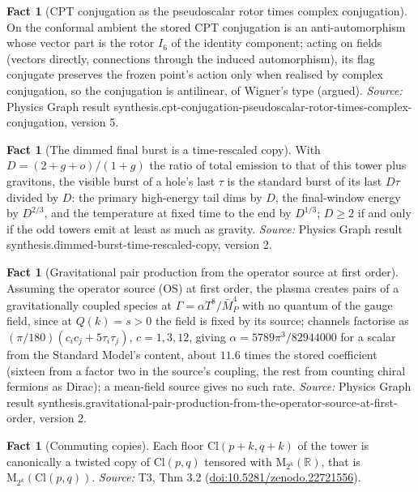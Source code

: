 \documentclass[11pt]{article}
\theoremstyle{definition}
\newtheorem{fact}[theorem]{Fact}
\theoremstyle{plain}
\providecommand{\Cl}{}\renewcommand{\Cl}{\mathrm{Cl}}
\providecommand{\Mat}{}\renewcommand{\Mat}{\mathrm{M}}
\providecommand{\R}{}\renewcommand{\R}{\mathbb{R}}
\begin{document}
\begin{fact}[CPT conjugation as the pseudoscalar rotor times complex conjugation]\label{c:synthesis.cpt-conjugation-pseudoscalar-rotor-times-complex-conjugation}
On the conformal ambient the stored CPT conjugation is an anti-automorphism whose vector part is the rotor $I_6$ of the identity component; acting on fields (vectors directly, connections through the induced automorphism), its flag conjugate preserves the frozen point's action only when realised by complex conjugation, so the conjugation is antilinear, of Wigner's type (argued).
\emph{Source:} Physics Graph result synthesis.cpt-conjugation-pseudoscalar-rotor-times-complex-conjugation, version 5.
\end{fact}

\begin{fact}[The dimmed final burst is a time-rescaled copy]\label{c:synthesis.dimmed-burst-time-rescaled-copy}
With $D = (2 + g + o)/(1 + g)$ the ratio of total emission to that of this tower plus gravitons, the visible burst of a hole's last $\tau$ is the standard burst of its last $D\tau$ divided by $D$: the primary high-energy tail dims by $D$, the final-window energy by $D^{2/3}$, and the temperature at fixed time to the end by $D^{1/3}$; $D \ge 2$ if and only if the odd towers emit at least as much as gravity.
\emph{Source:} Physics Graph result synthesis.dimmed-burst-time-rescaled-copy, version 2.
\end{fact}

\begin{fact}[Gravitational pair production from the operator source at first order]\label{c:synthesis.gravitational-pair-production-from-the-operator-source-at-first-order}
Assuming the operator source (OS) at first order, the plasma creates pairs of a gravitationally coupled species at $\Gamma = \alpha T^{8}/\bar{M}_{P}^{4}$ with no quantum of the gauge field, since at $Q(k) = s > 0$ the field is fixed by its source; channels factorise as $(\pi/180)(c_{i}c_{j} + 5\tau_{i}\tau_{j})$, $c = 1, 3, 12$, giving $\alpha = 5789\pi^{3}/82944000$ for a scalar from the Standard Model's content, about $11.6$ times the stored coefficient (sixteen from a factor two in the source's coupling, the rest from counting chiral fermions as Dirac); a mean-field source gives no such rate.
\emph{Source:} Physics Graph result synthesis.gravitational-pair-production-from-the-operator-source-at-first-order, version 2.
\end{fact}

\begin{fact}[Commuting copies]\label{c:tower.commuting-copies}
Each floor $\Cl(p{+}k, q{+}k)$ of the tower is canonically a twisted copy of $\Cl(p,q)$ tensored with $\Mat_{2^k}(\R)$, that is $\Mat_{2^k}(\Cl(p,q))$.
\emph{Source:} T3, Thm 3.2 (\href{https://doi.org/10.5281/zenodo.22721556}{doi:10.5281/zenodo.22721556}).
\end{fact}
\end{document}
